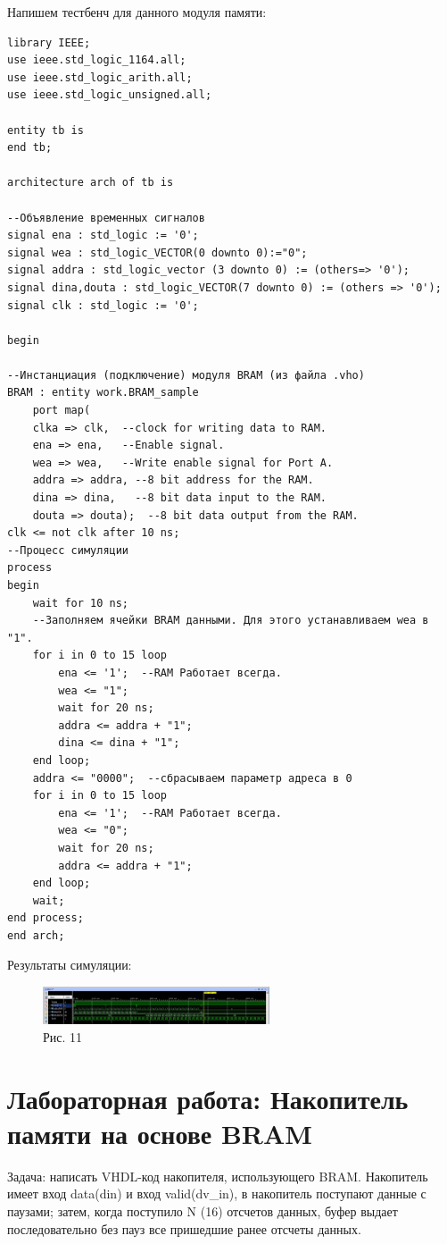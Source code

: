 Напишем тестбенч для данного модуля памяти: 
\begin{Code}
\begin{lstlisting}
library IEEE;
use ieee.std_logic_1164.all;
use ieee.std_logic_arith.all;
use ieee.std_logic_unsigned.all;

entity tb is   
end tb;

architecture arch of tb is

--Объявление временных сигналов
signal ena : std_logic := '0';
signal wea : std_logic_VECTOR(0 downto 0):="0";
signal addra : std_logic_vector (3 downto 0) := (others=> '0');
signal dina,douta : std_logic_VECTOR(7 downto 0) := (others => '0');
signal clk : std_logic := '0';

begin

--Инстанциация (подключение) модуля BRAM (из файла .vho)
BRAM : entity work.BRAM_sample
    port map(
    clka => clk,  --clock for writing data to RAM.
    ena => ena,   --Enable signal.
    wea => wea,   --Write enable signal for Port A.
    addra => addra, --8 bit address for the RAM.
    dina => dina,   --8 bit data input to the RAM.
    douta => douta);  --8 bit data output from the RAM. 
clk <= not clk after 10 ns;
--Процесс симуляции
process
begin
    wait for 10 ns;
    --Заполняем ячейки BRAM данными. Для этого устанавливаем wea в "1".
    for i in 0 to 15 loop
        ena <= '1';  --RAM Работает всегда.
        wea <= "1";
        wait for 20 ns;
        addra <= addra + "1";
        dina <= dina + "1";
    end loop;   
    addra <= "0000";  --сбрасываем параметр адреса в 0
    for i in 0 to 15 loop
        ena <= '1';  --RAM Работает всегда.
        wea <= "0";
        wait for 20 ns;
        addra <= addra + "1";
    end loop;
    wait;
end process;     
end arch;
\end{lstlisting}
\end{Code}

Результаты симуляции:

\begin{figure}[h]
\centering
\includegraphics[width=0.6\textwidth]{11}
\caption{Рис. 11}
\label{11_label}
\end{figure}

\section{Лабораторная работа: Накопитель памяти на основе BRAM}
Задача: написать VHDL-код накопителя, использующего BRAM. Накопитель имеет вход data(din) и вход valid(dv_in), в накопитель поступают данные с паузами; затем, когда поступило N (16) отсчетов данных, буфер выдает последовательно без пауз все пришедшие ранее отсчеты данных.

